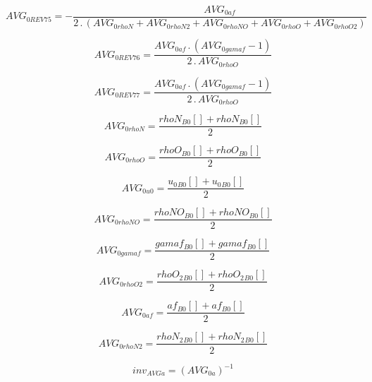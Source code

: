 \documentclass{article}
\begin{document}
\begin{dmath}AVG_{0 REV 75} = - \frac{AVG_{0 af}}{2 \,.\, \left(AVG_{0 rhoN} + AVG_{0 rhoN2} + AVG_{0 rhoNO} + AVG_{0 rhoO} + AVG_{0 rhoO2}\right)}\end{dmath}

\begin{dmath}AVG_{0 REV 76} = \frac{AVG_{0 af} \,.\, \left(AVG_{0 gamaf} - 1\right)}{2 \,.\, AVG_{0 rhoO}}\end{dmath}

\begin{dmath}AVG_{0 REV 77} = \frac{AVG_{0 af} \,.\, \left(AVG_{0 gamaf} - 1\right)}{2 \,.\, AVG_{0 rhoO}}\end{dmath}

\begin{dmath}AVG_{0 rhoN} = \frac{{rhoN{_{B0}}}[{}] + {rhoN{_{B0}}}[{}]}{2}\end{dmath}

\begin{dmath}AVG_{0 rhoO} = \frac{{rhoO{_{B0}}}[{}] + {rhoO{_{B0}}}[{}]}{2}\end{dmath}

\begin{dmath}AVG_{0 u0} = \frac{{u_{0}{_{B0}}}[{}] + {u_{0}{_{B0}}}[{}]}{2}\end{dmath}

\begin{dmath}AVG_{0 rhoNO} = \frac{{rhoNO{_{B0}}}[{}] + {rhoNO{_{B0}}}[{}]}{2}\end{dmath}

\begin{dmath}AVG_{0 gamaf} = \frac{{gamaf{_{B0}}}[{}] + {gamaf{_{B0}}}[{}]}{2}\end{dmath}

\begin{dmath}AVG_{0 rhoO2} = \frac{{rhoO_{2}{_{B0}}}[{}] + {rhoO_{2}{_{B0}}}[{}]}{2}\end{dmath}

\begin{dmath}AVG_{0 af} = \frac{{af{_{B0}}}[{}] + {af{_{B0}}}[{}]}{2}\end{dmath}

\begin{dmath}AVG_{0 rhoN2} = \frac{{rhoN_{2}{_{B0}}}[{}] + {rhoN_{2}{_{B0}}}[{}]}{2}\end{dmath}

\begin{dmath}inv_{AVG a} = \left(AVG_{0 a} \right)^{-1}\end{dmath}
\end{document}
